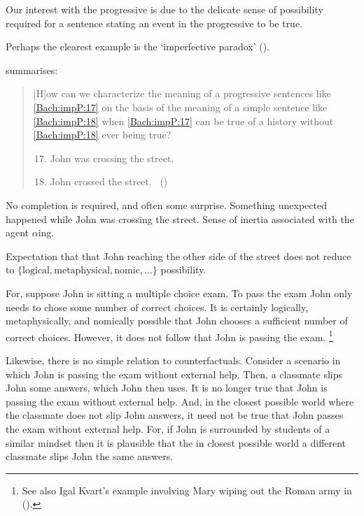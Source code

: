 \begin{note}
  Our interest with the progressive is due to the delicate sense of possibility required for a sentence stating an event in the progressive to be true.

  Perhaps the clearest example is the `imperfective paradox' (\citeyear[cf.][Ch.3.1]{Dowty:1979vq}).

  \citeauthor{Bach:1986tb} summarises:
  \begin{quote}
    [H]ow can we characterize the meaning of a progressive sentences like \ref{Bach:impP:17} on the basis of the meaning of a simple sentence like \ref{Bach:impP:18} when \ref{Bach:impP:17} can be true of a history without \ref{Bach:impP:18} ever being true?
    \begin{enumerate}[label=(\arabic*), ref=(\arabic*)]
      \setcounter{enumi}{16}
    \item
      \label{Bach:impP:17}
      John was crossing the street.
    \item
      \label{Bach:impP:18}
      John crossed the street.%
      \mbox{ }\hfill\mbox{(\citeyear[12]{Bach:1986tb})}
    \end{enumerate}
  \end{quote}

  No completion is required, and often some surprise.
  Something unexpected happened while John was crossing the street.
  Sense of inertia associated with the agent \(\alpha\)ing.

  Expectation that that John reaching the other side of the street does not reduce to \(\{\text{logical}, \text{metaphysical}, \text{nomic}, \dots\}\) possibility.

  For, suppose John is sitting a multiple choice exam.
  To pass the exam John only needs to chose some number of correct choices.
  It is certainly logically, metaphysically, and nomically possible that John chooses a sufficient number of correct choices.
  However, it does not follow that John is passing the exam.%
  \footnote{
    See also Igal Kvart's example involving Mary wiping out the Roman army in (\cite[18]{Landman:1992wh}).
  }

  Likewise, there is no simple relation to counterfactuals.
  Consider a scenario in which John is passing the exam without external help.
  Then, a classmate slips John some answers, which John then uses.
  It is no longer true that John is passing the exam without external help.
  And, in the closest possible world where the classmate does not slip John answers, it need not be true that John passes the exam without external help.
  For, if John is surrounded by students of a similar mindset then it is plausible that the in closest possible world a different classmate slips John the same answers.
\end{note}

